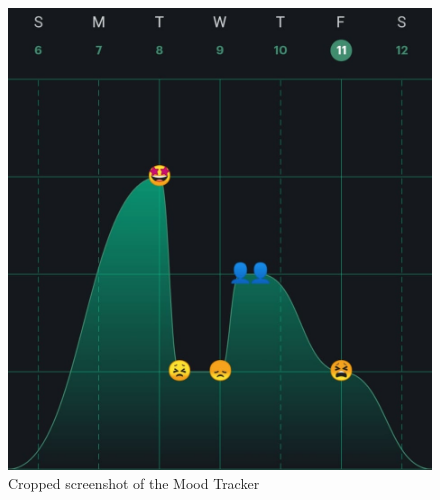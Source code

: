 \begin{figure}[ht]
  \begin{center}
  \includegraphics[width=1\columnwidth]{files/moodtracker.png}
    \caption{\label{fig:moodtracker} Cropped screenshot of the Mood Tracker}
  \end{center}
  \end{figure}








